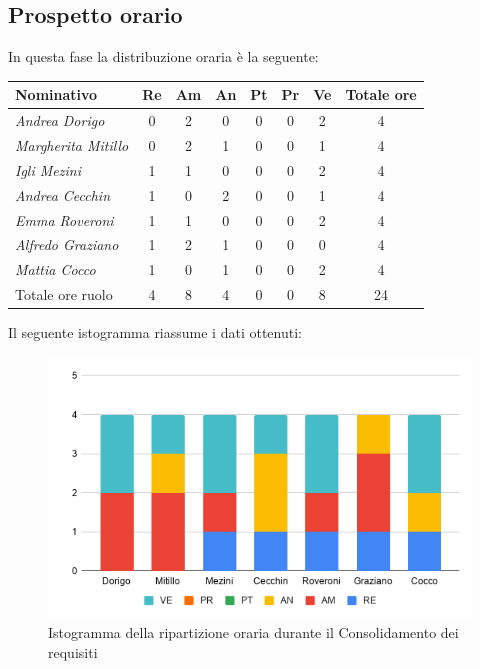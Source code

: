 {{\subsection{Prospetto orario}\label{PreventivoFaseDiConsolidamentoDeiRequisitiProspettoOrario}
In questa fase la distribuzione oraria è la seguente:
\quad
\def\tabularxcolumn#1{m{#1}}
{

	\begin{center}
		\renewcommand{\arraystretch}{1.4}
		\begin{tabularx}{\textwidth}{|X|c|c|c|c|c|c|c|}
			\hline
			\rowcolor{airforceblue}
			\textbf{Nominativo} & \textbf{Re} & \textbf{Am} & \textbf{An} & \textbf{Pt} & \textbf{Pr} & \textbf{Ve} & \textbf{Totale ore}\\
			\hline
			\textit{Andrea Dorigo} & 0 & 2 & 0 & 0 & 0 & 2 & 4\\
			\hline
			\textit{Margherita Mitillo} & 0 & 2 & 1 & 0 & 0 & 1 & 4\\
			\hline
			\textit{Igli Mezini} & 1 & 1 & 0 & 0 & 0 & 2 & 4\\
			\hline
			\textit{Andrea Cecchin} & 1 & 0 & 2 & 0 & 0 & 1 & 4\\
			\hline
			\textit{Emma Roveroni} & 1 & 1 & 0 & 0 & 0 & 2 & 4\\
			\hline
			\textit{Alfredo Graziano} & 1 & 2 & 1 & 0 & 0 & 0 & 4\\
			\hline
			\textit{Mattia Cocco} & 1 & 0 & 1 & 0 & 0 & 2 & 4\\
			\hline
			Totale ore ruolo & 4 & 8 & 4 & 0 & 0 & 8 & 24\\
			\hline
		\end{tabularx}
	\end{center}
Il seguente istogramma riassume i dati ottenuti:
\begin{figure}[!ht]
	\begin{center}
		\includegraphics[width=0.7\linewidth]{../immagini/pdp/istogramma_consolidamento_requisiti.png}
		\caption{Istogramma della ripartizione oraria durante il Consolidamento dei requisiti
}
	\end{center}
\end{figure}

}}}
